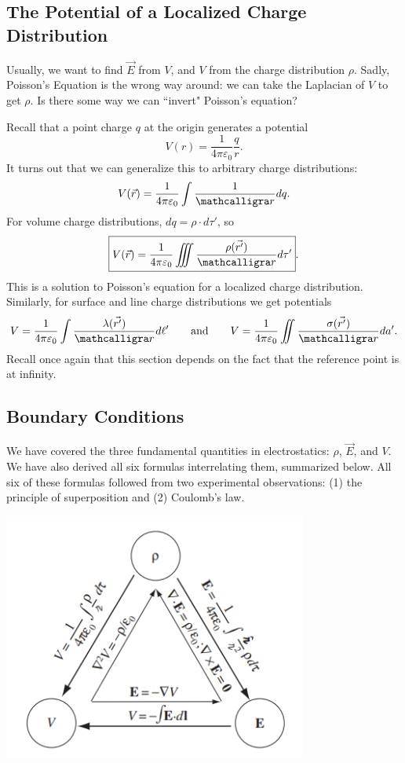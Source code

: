 \subsection{The Potential of a Localized Charge Distribution}

Usually, we want to find $\vec{E}$ from $V$, and $V$ from the charge distribution $\rho$. Sadly, Poisson's Equation is the wrong way around: we can take the Laplacian of $V$ to get $\rho$. Is there some way we can ``invert" Poisson's equation?

Recall that a point charge $q$ at the origin generates a potential
\[V(r)=\frac{1}{4\pi\varepsilon_0}\frac{q}{r}.\]
It turns out that we can generalize this to arbitrary charge distributions:
\[V(\vec{r})=\frac{1}{4\pi\varepsilon_0}\int\frac{1}{\scr}dq.\]
For volume charge distributions, $dq=\rho\cdot d\tau'$, so
\[\boxed{V(\vec{r})=\frac{1}{4\pi\varepsilon_0}\iiint\frac{\rho(\vec{r'})}{\scr}d\tau'}.\]
This is a solution to Poisson's equation for a localized charge distribution. Similarly, for surface and line charge distributions we get potentials
\[V=\frac{1}{4\pi\varepsilon_0}\int\frac{\lambda(\vec{r'})}{\scr}d\ell'\qquad\text{and}\qquad V=\frac{1}{4\pi\varepsilon_0}\iint\frac{\sigma(\vec{r'})}{\scr}da'.\]
Recall once again that this section depends on the fact that the reference point is at infinity.

\subsection{Boundary Conditions}

We have covered the three fundamental quantities in electrostatics: $\rho$, $\vec{E}$, and $V$. We have also derived all six formulas interrelating them, summarized below. All six of these formulas followed from two experimental observations: (1) the principle of superposition and (2) Coulomb's law.

\begin{center}
    \includegraphics[width=10cm]{Electrodynamics/images/fig2.35.PNG}
\end{center}

